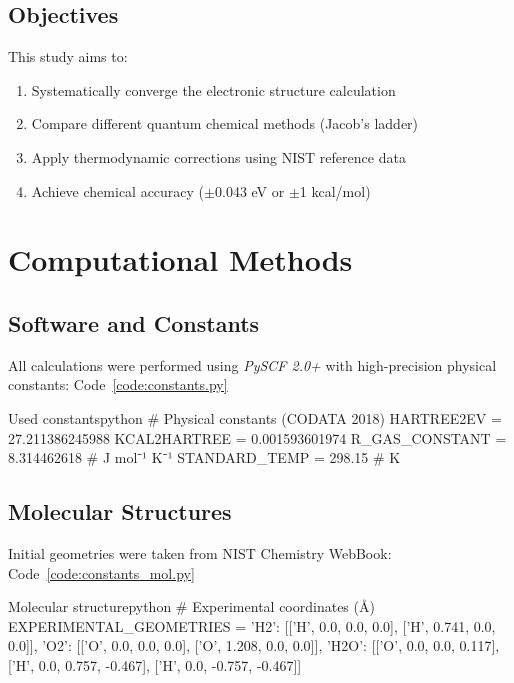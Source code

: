 \documentclass{template}
\begin{document}
\subsection{Objectives}
This study aims to:
\begin{enumerate}
\item Systematically converge the electronic structure calculation
\item Compare different quantum chemical methods (Jacob's ladder)
\item Apply thermodynamic corrections using NIST reference data
\item Achieve chemical accuracy ($\pm$0.043 eV or $\pm$1 kcal/mol)
\end{enumerate}


\section{Computational Methods}

\subsection{Software and Constants}
All calculations were performed using \textit{PySCF 2.0+} with high-precision physical constants: Code~\ref{code:constants.py}
\begin{codebox}{Used constants}{python}
# Physical constants (CODATA 2018)
    HARTREE2EV = 27.211386245988
    KCAL2HARTREE = 0.001593601974
    R_GAS_CONSTANT = 8.314462618  # J mol⁻¹ K⁻¹
    STANDARD_TEMP = 298.15  # K
\end{codebox}

\subsection{Molecular Structures}
Initial geometries were taken from NIST Chemistry WebBook: Code~\ref{code:constants_mol.py}
\begin{codebox}{Molecular structure}{python}
# Experimental coordinates (Å)
EXPERIMENTAL_GEOMETRIES = {
    'H2': [['H', 0.0, 0.0, 0.0], ['H', 0.741, 0.0, 0.0]],
    'O2': [['O', 0.0, 0.0, 0.0], ['O', 1.208, 0.0, 0.0]], 
    'H2O': [['O', 0.0, 0.0, 0.117], 
            ['H', 0.0, 0.757, -0.467], 
            ['H', 0.0, -0.757, -0.467]]
}
\end{codebox}
\end{document}
